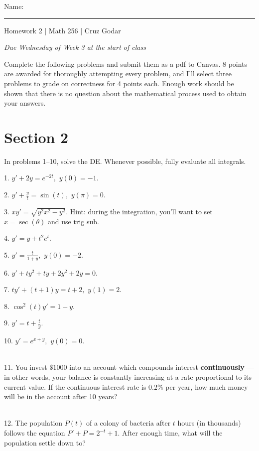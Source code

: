 \documentclass{article}
\begin{document}
\Large Name: \rule{2in}{0.15mm} \hfill Homework 2 | Math 256 | Cruz Godar \vspace{4pt}  \normalsize

\textit{Due Wednesday of Week 3 at the start of class}

Complete the following problems and submit them as a pdf to Canvas. 8 points are awarded for thoroughly attempting every problem, and I'll select three problems to grade on correctness for 4 points each. Enough work should be shown that there is no question about the mathematical process used to obtain your answers.

\section{Section 2}

In problems 1--10, solve the DE. Whenever possible, fully evaluate all integrals.

1. $\displaystyle y' + 2y = e^{-2t},$ $\displaystyle y(0) = -1.$

2. $\displaystyle y' + \frac{y}{t} = \sin(t),$ $\displaystyle y(\pi) = 0.$

3. $\displaystyle xy' = \sqrt{y^2x^2 - y^2}.$ Hint: during the integration, you'll want to set $x = \sec(\theta)$ and use trig sub.

4. $\displaystyle y' = y + t^2e^t.$

5. $\displaystyle y' = \frac{t}{1 + y},$ $\displaystyle y(0) = -2.$

6. $\displaystyle y' + ty^2 + ty + 2y^2 + 2y = 0.$

7. $\displaystyle ty' + (t + 1)y = t + 2,$ $\displaystyle y(1) = 2.$

8. $\displaystyle \cos^2(t)y' = 1 + y.$

9. $\displaystyle y' = t + \frac{t}{y}.$

10. $\displaystyle y' = e^{x + y},$ $\displaystyle y(0) = 0.$

~\\

11. You invest $\$1000$ into an account which compounds interest \textbf{continuously} --- in other words, your balance is constantly increasing at a rate proportional to its current value. If the continuous interest rate is $0.2\%$ per year, how much money will be in the account after 10 years?

~\\

12. The population $P(t)$ of a colony of bacteria after $t$ hours (in thousands) follows the equation $\displaystyle P' + P = 2^{-t} + 1.$ After enough time, what will the population settle down to?
\end{document}
